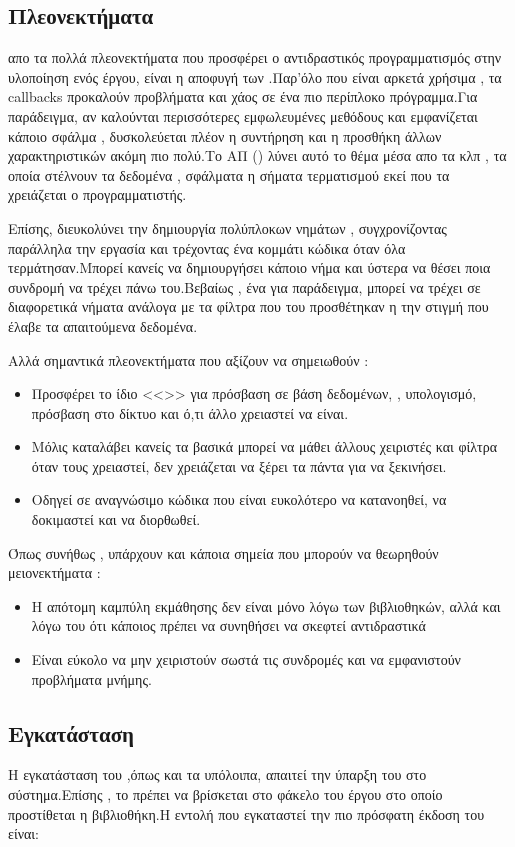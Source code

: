 \subsection*{Πλεονεκτήματα}
 απο τα πολλά πλεονεκτήματα που προσφέρει ο αντιδραστικός προγραμματισμός στην υλοποίηση ενός έργου, είναι η αποφυγή των .Παρ'όλο που είναι αρκετά χρήσιμα , τα \textlatin{callbacks} προκαλούν προβλήματα και χάος σε ένα πιο περίπλοκο πρόγραμμα.Για παράδειγμα, αν καλούνται περισσότερες εμφωλευμένες μεθόδους και εμφανίζεται κάποιο σφάλμα , δυσκολεύεται πλέον η συντήρηση και η προσθήκη άλλων χαρακτηριστικών ακόμη πιο πολύ.Το ΑΠ () λύνει αυτό το θέμα μέσα απο τα  κλπ , τα οποία στέλνουν τα δεδομένα , σφάλματα η σήματα τερματισμού εκεί που τα χρειάζεται ο προγραμματιστής.\par
Επίσης, διευκολύνει την δημιουργία πολύπλοκων νημάτων , συγχρονίζοντας παράλληλα την εργασία και τρέχοντας ένα κομμάτι κώδικα όταν όλα τερμάτησαν.Μπορεί κανείς να δημιουργήσει κάποιο νήμα και ύστερα να θέσει ποια συνδρομή να τρέχει πάνω του.Βεβαίως , ένα  για παράδειγμα, μπορεί να τρέχει σε διαφορετικά νήματα ανάλογα με τα φίλτρα που του προσθέτηκαν η την στιγμή που έλαβε τα απαιτούμενα δεδομένα.\par
Αλλά σημαντικά πλεονεκτήματα που αξίζουν να σημειωθούν : 
\begin{itemize}
    \item Προσφέρει το ίδιο <<>> για πρόσβαση σε βάση δεδομένων, , υπολογισμό, πρόσβαση στο δίκτυο και ό,τι άλλο χρειαστεί να είναι.
    \item Μόλις καταλάβει κανείς τα βασικά μπορεί να μάθει άλλους χειριστές και φίλτρα όταν τους χρειαστεί, δεν χρειάζεται να ξέρει τα πάντα για να ξεκινήσει.
    \item Οδηγεί σε αναγνώσιμο κώδικα που είναι ευκολότερο να κατανοηθεί, να δοκιμαστεί και να διορθωθεί.
\end{itemize}
Όπως συνήθως , υπάρχουν και κάποια σημεία που μπορούν να θεωρηθούν μειονεκτήματα :
\begin{itemize}
    \item Η απότομη καμπύλη εκμάθησης δεν είναι μόνο λόγω των βιβλιοθηκών, αλλά και λόγω του ότι κάποιος πρέπει να συνηθήσει να σκεφτεί αντιδραστικά
    \item Είναι εύκολο να μην χειριστούν σωστά τις συνδρομές και να εμφανιστούν προβλήματα μνήμης.
\end{itemize}

\subsection*{Εγκατάσταση}
\quad Η εγκατάσταση του  ,όπως και τα υπόλοιπα, απαιτεί την ύπαρξη του  στο σύστημα.Επίσης , το  πρέπει να βρίσκεται στο φάκελο του έργου στο οποίο προστίθεται η βιβλιοθήκη.Η εντολή που εγκαταστεί την πιο πρόσφατη έκδοση του  είναι:

